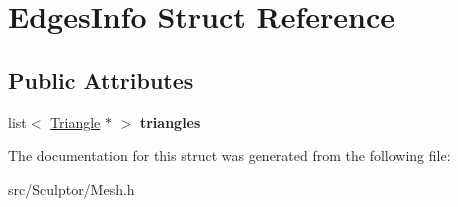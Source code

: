 \hypertarget{struct_edges_info}{
\section{\-Edges\-Info \-Struct \-Reference}
\label{struct_edges_info}
}
\subsection*{\-Public \-Attributes}
\begin{DoxyCompactItemize}
\item 
\hypertarget{struct_edges_info_a911c40f7921973569855aedf49da13cd}{
list$<$ \hyperlink{class_triangle}{\-Triangle} $\ast$ $>$ {\bfseries triangles}}
\label{struct_edges_info_a911c40f7921973569855aedf49da13cd}

\end{DoxyCompactItemize}


\-The documentation for this struct was generated from the following file\-:\begin{DoxyCompactItemize}
\item 
src/\-Sculptor/\-Mesh.\-h\end{DoxyCompactItemize}
